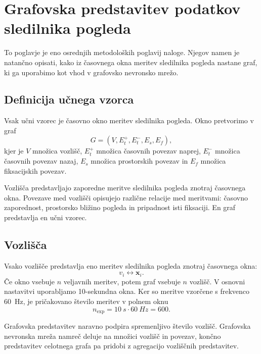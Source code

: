 \chapter{Grafovska predstavitev podatkov sledilnika pogleda}
\label{sec:grafovska-predstavitev}

To poglavje je eno osrednjih metodoloških poglavij naloge.
Njegov namen je natančno opisati, kako iz časovnega okna meritev sledilnika pogleda nastane graf, ki ga uporabimo kot vhod v grafovsko nevronsko mrežo.

\section{Definicija učnega vzorca}
\label{subsec:ucni-vzorec}

Vsak učni vzorec je časovno okno meritev sledilnika pogleda.
Okno pretvorimo v graf
\begin{equation}
    G = (V, E_t^+, E_t^-, E_s, E_f),
\end{equation}
kjer je $V$ množica vozlišč, $E_t^+$ množica časovnih povezav naprej, $E_t^-$ množica časovnih povezav nazaj, $E_s$ množica prostorskih povezav in $E_f$ množica fiksacijskih povezav.

Vozlišča predstavljajo zaporedne meritve sledilnika pogleda znotraj časovnega okna.
Povezave med vozlišči opisujejo različne relacije med meritvami: časovno zaporednost, prostorsko bližino pogleda in pripadnost isti fiksaciji.
En graf predstavlja en učni vzorec.

\section{Vozlišča}
\label{subsec:vozlisca}

Vsako vozlišče predstavlja eno meritev sledilnika pogleda znotraj časovnega okna:
\begin{equation}
    v_i \leftrightarrow \mathbf{x}_i.
\end{equation}
Če okno vsebuje $n$ veljavnih meritev, potem graf vsebuje $n$ vozlišč.
V osnovni nastavitvi uporabljamo 10-sekundna okna.
Ker so meritve vzorčene s frekvenco 60~Hz, je pričakovano število meritev v polnem oknu
\begin{equation}
    n_{\mathrm{exp}} = 10~s \cdot 60~Hz = 600.
\end{equation}

Grafovska predstavitev naravno podpira spremenljivo število vozlišč.
Grafovska nevronska mreža namreč deluje na množici vozlišč in povezav, končno predstavitev celotnega grafa pa pridobi z agregacijo vozliščnih predstavitev.

